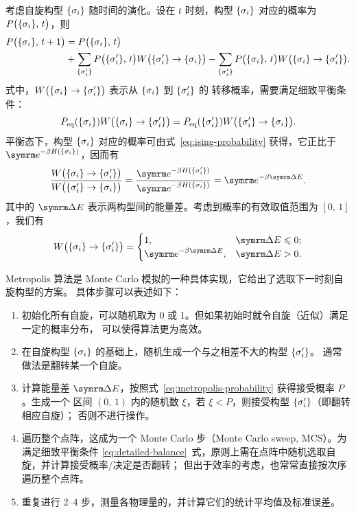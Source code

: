 考虑自旋构型 ${\{\sigma_i\}}$ 随时间的演化。设在 $t$ 时刻，构型 ${\{\sigma_i\}}$ 对应的概率为
$P\qty\big({\{\sigma_i\}},\,t)$，则
\begin{align}
  P\qty\big({\{\sigma_i\}},\,t+1)
  &= P\qty\big({\{\sigma_i\}},\,t) \notag \\
  &+ \sum_{{\{\sigma'_i\}}} P\qty\big({\{\sigma'_i\}},\,t) W\qty\big({\{\sigma'_i\}}\to{\{\sigma_i\}})
   - \sum_{{\{\sigma'_i\}}} P\qty\big({\{\sigma_i\}},\,t)  W\qty\big({\{\sigma_i\}}\to{\{\sigma'_i\}}).
\end{align}
式中，$W\qty\big({\{\sigma_i\}}\to{\{\sigma'_i\}})$ 表示从 ${\{\sigma_i\}}$ 到 ${\{\sigma'_i\}}$ 的
转移概率，需要满足细致平衡条件：
\begin{equation}
  \label{eq:detailed-balance}
    P_{\text{eq}}({\{\sigma_i\}})  W\qty\big({\{\sigma_i\}}\to{\{\sigma'_i\}})
  = P_{\text{eq}}({\{\sigma'_i\}}) W\qty\big({\{\sigma'_i\}}\to{\{\sigma_i\}}).
\end{equation}
平衡态下，构型 ${\{\sigma_i\}}$ 对应的概率可由式~\eqref{eq:ising-probability} 获得，它正比于
$\ee^{-\beta H(\q{\sigma_i})}$，因而有
\begin{equation}
    \frac{W\qty\big(\q{\sigma_i}\to\q{\sigma'_i})}{W\qty\big(\q{\sigma'_i}\to\q{\sigma_i})}
  = \frac{\ee^{-\beta H(\q{\sigma'_i})}}{\ee^{-\beta H(\q{\sigma_i})}}
  = \ee^{-\beta \incr{E}}.
\end{equation}
其中的 $\incr{E}$ 表示两构型间的能量差。考虑到概率的有效取值范围为 $[0,\,1]$，我们有
\begin{equation}
  \label{eq:metropolis-probability}
  W\qty\big(\q{\sigma_i}\to\q{\sigma'_i}) =
  \begin{cases}
    1, & \incr{E} \leqslant 0; \\
    \ee^{-\beta \incr{E}}, & \incr{E} > 0. \\
  \end{cases}
\end{equation}

Metropolis 算法是 Monte Carlo 模拟的一种具体实现，它给出了选取下一时刻自旋构型的方案。
具体步骤可以表述如下：

\begin{enumerate}
  \item 初始化所有自旋，可以随机取为 0 或 1。但如果初始时就令自旋（近似）满足一定的概率分布，
    可以使得算法更为高效。
  \item 在自旋构型 ${\{\sigma_i\}}$ 的基础上，随机生成一个与之相差不大的构型 ${\{\sigma'_i\}}$。
    通常做法是翻转某一个自旋。
  \item 计算能量差 $\incr{E}$，按照式~\eqref{eq:metropolis-probability} 获得接受概率 $P$。生成一个
    区间 $(0,\,1)$ 内的随机数 $\xi$，若 $\xi<P$，则接受构型 ${\{\sigma'_i\}}$（即翻转相应自旋）；
    否则不进行操作。
  \item 遍历整个点阵，这成为一个 Monte Carlo 步（Monte Carlo sweep, MCS）。为满足细致平衡条件
    \eqref{eq:detailed-balance}~式，原则上需在点阵中随机选取自旋，并计算接受概率/决定是否翻转；
    但出于效率的考虑，也常常直接按次序遍历整个点阵。
  \item 重复进行 2--4 步，测量各物理量的，并计算它们的统计平均值及标准误差。
\end{enumerate}

